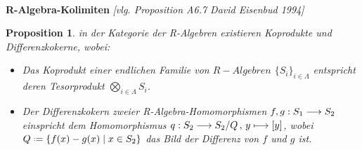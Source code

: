 \documentclass[10pt,a4paper]{report}
\newcommand{\ModulsOfDifferenzials}{David Eisenbud 1994}
\newcounter{Aussage}[chapter]
\newtheorem{prop}[Aussage]{Proposition}
\newcommand{\functionfront}[3]{\nolinebreak{#1:#2 \longrightarrow #3}}
\newcommand{\function}[5]{\nolinebreak{#1:#2 \longrightarrow #3 \, , \, #4 \longmapsto #5}}
\newcommand*{\defeq}{\mathrel{\vcenter{\baselineskip0.5ex \lineskiplimit0pt
                     \hbox{\scriptsize.}\hbox{\scriptsize.}}}%
                     =}
\begin{document}
\ \\
\textbf{R-Algebra-Kolimiten} \textit{[vlg. Proposition A6.7 \ModulsOfDifferenzials]}
\begin{prop} \label{R-Algebra-Kolimiten}
in der Kategorie der R-Algebren existieren Koprodukte und Differenzkokerne, wobei:
\begin{itemize}
\item[\textbf{1.}] Das Koprodukt einer endlichen Familie von $R-Algebren$ $\lbrace S_i \rbrace_{i \in \Lambda}$ entspricht deren Tesorprodukt $\bigotimes_{i \in \Lambda} S_i$. 
\item[\textbf{2.}] Der Differenzkokern zweier R-Algebra-Homomorphismen $\functionfront{f,g}{S_1}{S_2}$ einspricht dem Homomorphismus $\function{q}{S_2}{S_2/Q}{y}{[y]}$, wobei $Q \defeq \lbrace f(x) - g(x)\mid x \in S_2 \rbrace$ das Bild der Differenz von $f$ und $g$ ist.
\end{itemize}
\end{prop}
\end{document}
